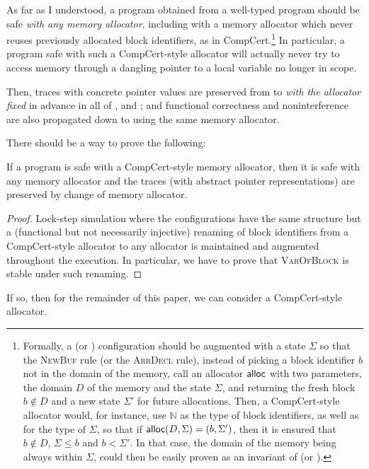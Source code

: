 As far as I understood, a \lowstar program obtained from a well-typed \fstar
program should be safe \emph{with any memory allocator}, including
with a memory allocator which never reuses previously allocated block
identifiers, as in CompCert.\footnote{Formally, a \lowstar (or \cstar)
  configuration should be augmented with a state $\Sigma$ so that the
  \lowstar \textsc{NewBuf} rule (or the \cstar \textsc{ArrDecl} rule), instead
  of picking a block identifier $b$ not in the domain of the memory,
  call an allocator $\text{\textsf{alloc}}$ with two parameters, the domain $D$
  of the memory and the state $\Sigma$, and returning the fresh block
  $b \not\in D$ and a new state $\Sigma'$ for future
  allocations. Then, a CompCert-style allocator would, for instance,
  use $\mathbb N$ as the type of block identifiers, as well as for the
  type of $\Sigma$, so that if $\text{\textsf{alloc}}(D, \Sigma) = (b, \Sigma')$,
  then it is ensured that $b \not\in D$, $\Sigma \leq b$ and $b <
  \Sigma'$. In that case, the domain of the memory being always within
  $\Sigma$, could then be easily proven as an invariant of \lowstar (or
  \cstar).} In particular, a \lowstar program safe with such a CompCert-style
allocator will actually never try to access memory through a dangling
pointer to a local variable no longer in scope.

Then, traces with concrete pointer values are preserved from \lowstar to
 \emph{with the allocator fixed} in advance in all of \lowstar, \cstar and
; and functional correctness and noninterference are also
propagated down to  using the same memory allocator.

There should be a way to prove the following:
\begin{lemma}
  If a  program is safe with a CompCert-style memory allocator,
  then it is safe with any memory allocator and the traces (with
  abstract pointer representations) are preserved by change of memory
  allocator.
\end{lemma}
\begin{proof}
  Lock-step simulation where the configurations have the same
  structure but a (functional but not necessarily injective) renaming
  of block identifiers from a CompCert-style allocator to any
  allocator is maintained and augmented throughout the execution. In
  particular, we have to prove that \textsc{VarOfBlock} is stable
  under such renaming.
\end{proof}

If so, then for the remainder of this paper, we can consider a
CompCert-style allocator.

